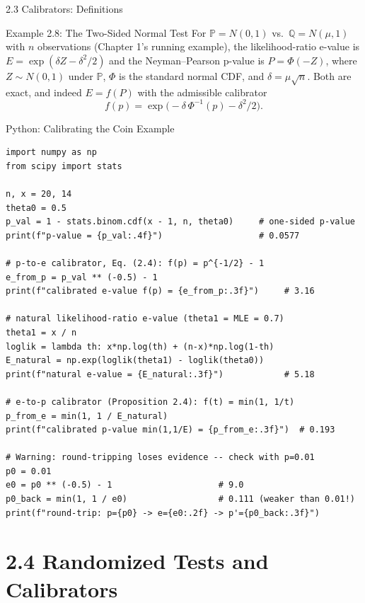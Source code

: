 \documentclass[aspectratio=169,10pt]{beamer}
\newcommand{\PP}{\mathbb{P}}
\newcommand{\QQ}{\mathbb{Q}}
\begin{document}
\begin{frame}[allowframebreaks]{2.3 Calibrators: Definitions}
  \begin{exampleblock}{Example 2.8: The Two-Sided Normal Test}
    For $\PP=N(0,1)$ vs.\ $\QQ=N(\mu,1)$ with $n$ observations
    (Chapter 1's running example), the likelihood-ratio e-value is
    $E=\exp(\delta Z - \delta^2/2)$ and the Neyman--Pearson p-value is
    $P=\Phi(-Z)$, where $Z\sim N(0,1)$ under $\PP$, $\Phi$ is the standard
    normal CDF, and $\delta=\mu\sqrt{n}$. Both are exact, and indeed
    $E=f(P)$ with the admissible calibrator
    \[
      f(p) = \exp\!\big(-\delta\,\Phi^{-1}(p) - \delta^2/2\big).
    \]
  \end{exampleblock}

\end{frame}

\begin{frame}[fragile]{Python: Calibrating the Coin Example}
\begin{lstlisting}[style=pycode]
import numpy as np
from scipy import stats

n, x = 20, 14
theta0 = 0.5
p_val = 1 - stats.binom.cdf(x - 1, n, theta0)     # one-sided p-value
print(f"p-value = {p_val:.4f}")                   # 0.0577

# p-to-e calibrator, Eq. (2.4): f(p) = p^{-1/2} - 1
e_from_p = p_val ** (-0.5) - 1
print(f"calibrated e-value f(p) = {e_from_p:.3f}")     # 3.16

# natural likelihood-ratio e-value (theta1 = MLE = 0.7)
theta1 = x / n
loglik = lambda th: x*np.log(th) + (n-x)*np.log(1-th)
E_natural = np.exp(loglik(theta1) - loglik(theta0))
print(f"natural e-value = {E_natural:.3f}")            # 5.18

# e-to-p calibrator (Proposition 2.4): f(t) = min(1, 1/t)
p_from_e = min(1, 1 / E_natural)
print(f"calibrated p-value min(1,1/E) = {p_from_e:.3f}")  # 0.193

# Warning: round-tripping loses evidence -- check with p=0.01
p0 = 0.01
e0 = p0 ** (-0.5) - 1                     # 9.0
p0_back = min(1, 1 / e0)                  # 0.111 (weaker than 0.01!)
print(f"round-trip: p={p0} -> e={e0:.2f} -> p'={p0_back:.3f}")
\end{lstlisting}
\end{frame}

\section{2.4 Randomized Tests and Calibrators}
\end{document}
